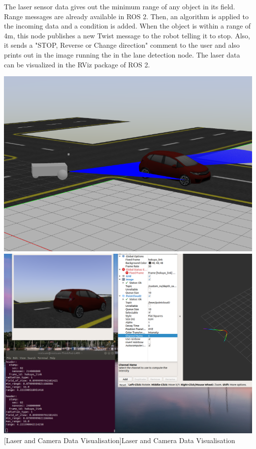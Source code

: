 \documentclass[%
xelatex,
	oneside,		%
	12pt,			%
	parskip=half,	%
	abstracton,
	chapterprefix=true%
    appendixprefix=true]
{scrbook}
\begin{document}
The laser sensor data gives out the minimum range of any object in its field. Range messages are already available in ROS 2. Then, an algorithm is applied to the incoming data and a condition is added. When the object is within a range of 4m, this node publishes a new Twist message to the robot telling it to stop. Also, it sends a "STOP, Reverse or Change direction" comment to the user and also prints out in the image running the in the lane detection node. The laser data can be visualized in the RViz package of ROS 2.
			\begin{center}
\includegraphics[scale=0.3]{fig/laser.png}
\includegraphics[scale=0.17]{fig/laser2.png}
[Laser and Camera Data Visualisation]{Laser and Camera Data Visualisation}
\label{fig:laser}
\end{center}
\end{document}
